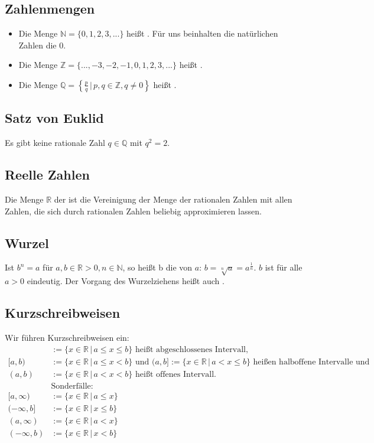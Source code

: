 \subsection{Zahlenmengen}
\begin{itemize}
\item{Die Menge $\mathbb{N} = \{0,1,2,3,...\}$ heißt . Für uns beinhalten die natürlichen Zahlen die $0$.}
\item{Die Menge $\mathbb{Z} = \{...,-3,-2,-1,0,1,2,3,...\}$ heißt .}
\item{Die Menge $\mathbb{Q} = \left\{\frac{p}{q}\,|\,p,q \in \mathbb{Z}, q \neq 0\right\}$ heißt .}
\end{itemize}

\subsection{Satz von Euklid}
Es gibt keine rationale Zahl $q \in \mathbb{Q}$ mit $q^2 = 2$.

\subsection{Reelle Zahlen}
Die Menge $\mathbb{R}$ der  ist die Vereinigung der Menge der rationalen Zahlen mit allen Zahlen, die sich durch rationalen Zahlen beliebig approximieren lassen.

\subsection{Wurzel}
Ist $b^n = a$ für $a, b \in \mathbb{R} > 0, n \in \mathbb{N}$, so heißt b die  von $a$: $b = \sqrt[n]{a}=a^\frac{1}{n}$. $b$ ist für alle $a > 0$ eindeutig. Der Vorgang des Wurzelziehens heißt auch .

\subsection{Kurzschreibweisen}
Wir führen Kurzschreibweisen ein:
\begin{align*}
[a,b] &:= \{x\in\mathbb{R}\,|\,a \leq x \leq b\}\text{ heißt abgeschlossenes Intervall,} \\
[a,b) &:= \{x\in\mathbb{R}\,|\,a \leq x < b\}\text{ und }(a,b] := \{x\in\mathbb{R}\,|\,a < x \leq b\}\text{ heißen halboffene Intervalle und} \\
(a,b) &:= \{x\in\mathbb{R}\,|\,a < x < b\}\text{ heißt offenes Intervall.} \\
&\text{Sonderfälle:} \\
[a, \infty) &:= \{x\in\mathbb{R}\,|\,a \leq x\} \\
(-\infty, b] &:= \{x\in\mathbb{R}\,|\,x \leq b\} \\
(a, \infty) &:= \{x\in\mathbb{R}\,|\,a < x\} \\
(-\infty, b) &:= \{x\in\mathbb{R}\,|\,x < b\}
\end{align*}

